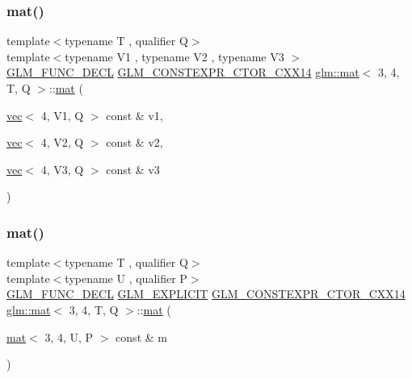 \subsubsection{\texorpdfstring{mat()}{mat()}\hspace{0.1cm}{\footnotesize\ttfamily [8/21]}}
{\footnotesize\ttfamily template$<$typename T , qualifier Q$>$ \\
template$<$typename V1 , typename V2 , typename V3 $>$ \\
\hyperlink{setup_8hpp_ab2d052de21a70539923e9bcbf6e83a51}{G\+L\+M\+\_\+\+F\+U\+N\+C\+\_\+\+D\+E\+CL} \hyperlink{setup_8hpp_a0900f9145e68bf6061b6f5e7be3fa751}{G\+L\+M\+\_\+\+C\+O\+N\+S\+T\+E\+X\+P\+R\+\_\+\+C\+T\+O\+R\+\_\+\+C\+X\+X14} \hyperlink{structglm_1_1mat}{glm\+::mat}$<$ 3, 4, T, Q $>$\+::\hyperlink{structglm_1_1mat}{mat} (\begin{DoxyParamCaption}\item[{\hyperlink{structglm_1_1vec}{vec}$<$ 4, V1, Q $>$ const \&}]{v1,  }\item[{\hyperlink{structglm_1_1vec}{vec}$<$ 4, V2, Q $>$ const \&}]{v2,  }\item[{\hyperlink{structglm_1_1vec}{vec}$<$ 4, V3, Q $>$ const \&}]{v3 }\end{DoxyParamCaption})}

\mbox{\label{structglm_1_1mat_3_013_00_014_00_01_t_00_01_q_01_4_ab07fea76c961a22e1aa486f9276f2d75}} 
\subsubsection{\texorpdfstring{mat()}{mat()}\hspace{0.1cm}{\footnotesize\ttfamily [9/21]}}
{\footnotesize\ttfamily template$<$typename T , qualifier Q$>$ \\
template$<$typename U , qualifier P$>$ \\
\hyperlink{setup_8hpp_ab2d052de21a70539923e9bcbf6e83a51}{G\+L\+M\+\_\+\+F\+U\+N\+C\+\_\+\+D\+E\+CL} \hyperlink{setup_8hpp_a6c74f5a5e7b134ab69023ff9a30d4d5d}{G\+L\+M\+\_\+\+E\+X\+P\+L\+I\+C\+IT} \hyperlink{setup_8hpp_a0900f9145e68bf6061b6f5e7be3fa751}{G\+L\+M\+\_\+\+C\+O\+N\+S\+T\+E\+X\+P\+R\+\_\+\+C\+T\+O\+R\+\_\+\+C\+X\+X14} \hyperlink{structglm_1_1mat}{glm\+::mat}$<$ 3, 4, T, Q $>$\+::\hyperlink{structglm_1_1mat}{mat} (\begin{DoxyParamCaption}\item[{\hyperlink{structglm_1_1mat}{mat}$<$ 3, 4, U, P $>$ const \&}]{m }\end{DoxyParamCaption})}

